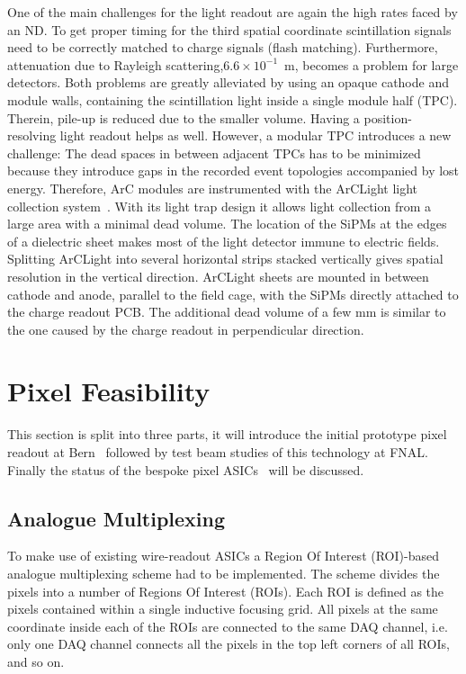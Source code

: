 \documentclass[a4paper]{article}
\begin{document}
One of the main challenges for the light readout are again the high rates faced by an ND.
To get proper timing for the third spatial coordinate scintillation signals need to be correctly matched to charge signals (flash matching).
Furthermore, attenuation due to Rayleigh scattering,$6.6\times10^{-1}$~m, becomes a problem for large detectors.
Both problems are greatly alleviated by using an opaque cathode and module walls, containing the scintillation light inside a single module half (TPC).
Therein, pile-up is reduced due to the smaller volume.
Having a position-resolving light readout helps as well.
However, a modular TPC introduces a new challenge: The dead spaces in between adjacent TPCs has to be minimized because they introduce gaps in the recorded event topologies accompanied by lost energy.
Therefore, ArC modules are instrumented with the ArCLight light collection system~\cite{arclight}.
With its light trap design it allows light collection from a large area with a minimal dead volume.
The location of the SiPMs at the edges of a dielectric sheet makes most of the light detector immune to electric fields.
Splitting ArCLight into several horizontal strips stacked vertically gives spatial resolution in the vertical direction.
ArCLight sheets are mounted in between cathode and anode, parallel to the field cage, with the SiPMs directly attached to the charge readout PCB.
The additional dead volume of a few \si{\milli\metre} is similar to the one caused by the charge readout in perpendicular direction.

\section{Pixel Feasibility}

This section is split into three parts, it will introduce the initial prototype pixel readout at Bern~\cite{pixels} followed by test beam studies of this technology at FNAL. Finally the status of the bespoke pixel ASICs~\cite{larpix} will be discussed.
    
\subsection{Analogue Multiplexing}

To make use of existing wire-readout ASICs a Region Of Interest (ROI)-based analogue multiplexing scheme had to be implemented. 
The scheme divides the pixels into a number of Regions Of Interest (ROIs).
Each ROI is defined as the pixels contained within a single inductive focusing grid.
All pixels at the same coordinate inside each of the ROIs are connected to the same DAQ channel, i.e. only one DAQ channel connects all the pixels in the top left corners of all ROIs, and so on.
\end{document}
